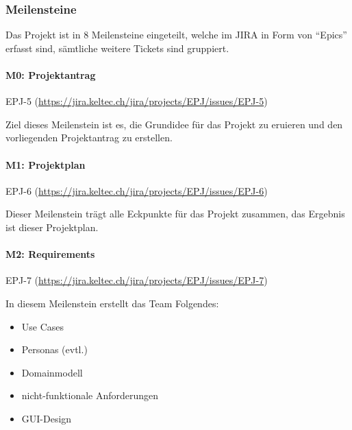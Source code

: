 \documentclass[a4paper]{article}
\def\jiraurl{https://jira.keltec.ch/jira}
\newcommand{\fulljiraissue}[1]{EPJ-#1 (\url{\jiraurl/projects/EPJ/issues/EPJ-#1})}
\begin{document}
\subsubsection{Meilensteine}

Das Projekt ist in 8 Meilensteine eingeteilt, welche im JIRA in Form von ``Epics'' erfasst sind, sämtliche weitere Tickets sind gruppiert.

\paragraph{M0: Projektantrag} \fulljiraissue{5}

Ziel dieses Meilenstein ist es, die Grundidee für das Projekt zu eruieren und den vorliegenden Projektantrag zu erstellen.

\paragraph{M1: Projektplan} \fulljiraissue{6}

Dieser Meilenstein trägt alle Eckpunkte für das Projekt zusammen, das Ergebnis ist dieser Projektplan.

\paragraph{M2: Requirements} \fulljiraissue{7}


In diesem Meilenstein erstellt das Team Folgendes:

\begin{itemize}
  \item Use Cases
  \item Personas (evtl.)
  \item Domainmodell
  \item nicht-funktionale Anforderungen
  \item GUI-Design
\end{itemize}
\end{document}
